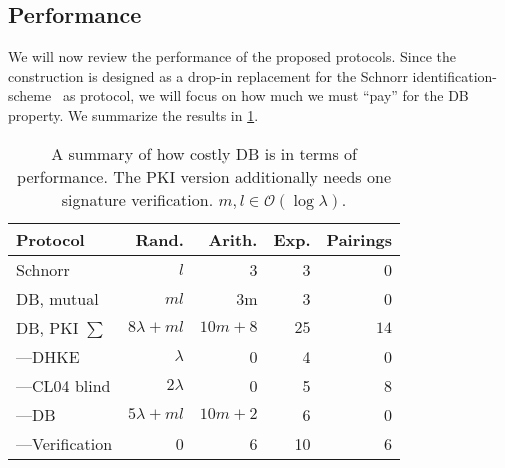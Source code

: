 \subsection{Performance}%
\label{performance}


We will now review the performance of the proposed protocols.
Since the construction is designed as a drop-in replacement for the Schnorr 
identification-scheme~\cite{Schnorr} as  protocol, we will focus on 
how much we must \enquote{pay} for the \ac{DB} property.
We summarize the results in \cref{performance-overview}.

\begin{frame}
  \begin{table}
    \caption{%
      A summary of how costly \acl*{DB} is in terms of performance.
      The \acs*{PKI} version additionally needs one signature verification.
      \(m, l\in \mathcal{O}(\log \lambda)\).
    }\label{performance-overview}
    \begin{tabular}{lrrrr}
      \toprule
      Protocol
      & Rand.
      & Arith.
      & Exp.
      & Pairings\\
      \midrule
      Schnorr             & \(l\)             & 3    & 3      & 0\\
      DB, mutual          & \(ml\)            & 3m   & 3      & 0\\
      DB, \acs*{PKI} \(\sum\)
                          & \(8\lambda + ml\)
                          & \(10m+8\)
                          & \(25\)
                          & \(14\)\\
      ---\acs*{DHKE}      & \(\lambda\)       & 0    & 4      & 0\\
      ---CL04 blind       & \(2\lambda\)      & 0    & 5      & 8\\
      ---DB               & \(5\lambda + ml\)    & \(10m + 2\) & 6 & 0\\
      ---Verification     & 0    & 6 & 10 & 6\\
      \bottomrule
    \end{tabular}
  \end{table}
\end{frame}

